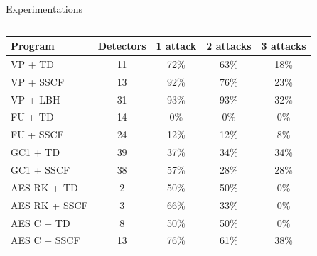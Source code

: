 \begin{frame}{Experimentations} 
    \begin{tiny}
        \begin{columns}
            \begin{column}{0.55\textwidth}
                \begin{table}[!t]
                    \centering
                    \label{tbl:ccpa-results}
                    \begin{tabular}{|l|c|c|c|c|}
                        \hline
                        Program       & \multicolumn{1}{l|}{Detectors} & \multicolumn{1}{l|}{1 attack} & \multicolumn{1}{l|}{2 attacks} & \multicolumn{1}{l|}{3 attacks} \\ \hline
                        VP + TD       & 11                       & 72\%                         & 63\%                          & 18\%                          \\ \hline
                        VP + SSCF     & 13                       & 92\%                         & 76\%                          & 23\%                          \\ \hline
                        VP + LBH       & 31                       & 93\%                         & 93\%                          & 32\%                          \\ \hline \hline
                        FU + TD       & 14                       & 0\%                          & 0\%                           & 0\%                           \\ \hline
                        FU + SSCF     & 24                       & 12\%                         & 12\%                          & 8\%                           \\ \hline \hline
                        GC1 + TD      & 39                       & 37\%                         & 34\%                          & 34\%                          \\ \hline
                        GC1 + SSCF    & 38                       & 57\%                         & 28\%                          & 28\%                          \\ \hline \hline
                        AES RK + TD   & 2                        & 50\%                        & 50\%                         & 0\%                         \\ \hline
                        AES RK + SSCF & 3                        & 66\%                        & 33\%                         & 0\%                         \\ \hline
                        AES C + TD    & 8                        & 50\%                         & 50\%                          & 0\%                           \\ \hline
                        AES C + SSCF  & 13                       & 76\%                         & 61\%                            & 38\%                             \\ \hline
                    \end{tabular}
                \end{table}
            \end{column}
        

\end{columns}
\end{tiny}
\end{frame}
